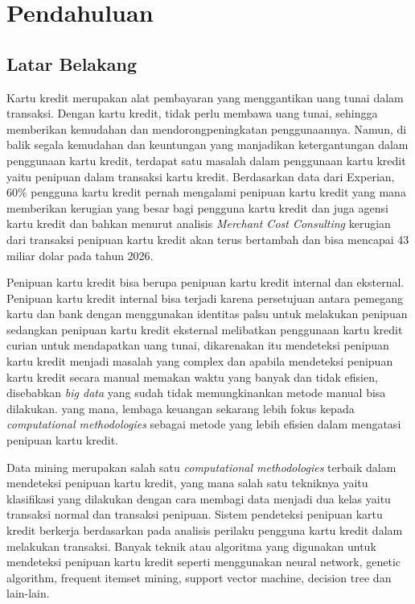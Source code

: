 \newpage
\chapter{Pendahuluan} \label{Bab I}

\section{Latar Belakang} \label{I.Latar Belakang}
Kartu kredit merupakan alat pembayaran yang menggantikan uang tunai dalam transaksi. Dengan kartu kredit, tidak perlu membawa uang tunai, sehingga memberikan kemudahan dan mendorongpeningkatan penggunaannya\cite{setiawan2022perlindungan}. Namun, di balik segala kemudahan dan keuntungan yang manjadikan ketergantungan dalam penggunaan kartu kredit, terdapat satu masalah dalam penggunaan kartu kredit yaitu penipuan dalam transaksi kartu kredit\cite{hendarsyah2020analisis}. Berdasarkan data dari Experian, 60\% pengguna kartu kredit pernah mengalami penipuan kartu kredit yang mana memberikan kerugian yang besar bagi pengguna kartu kredit dan juga agensi kartu kredit\cite{experian_2024} dan bahkan menurut analisis \textit{Merchant Cost Consulting} kerugian dari transaksi penipuan kartu kredit akan terus bertambah dan bisa mencapai 43 miliar dolar pada tahun 2026\cite{merchantcostconsulting_2024}.

Penipuan kartu kredit bisa berupa penipuan kartu kredit internal dan eksternal. Penipuan kartu kredit internal bisa terjadi karena persetujuan antara pemegang kartu dan bank dengan menggunakan identitas palsu untuk melakukan penipuan sedangkan penipuan kartu kredit eksternal melibatkan penggunaan kartu kredit curian untuk mendapatkan uang tunai\cite{chaudhary2012review}, dikarenakan itu mendeteksi penipuan kartu kredit menjadi masalah yang complex dan apabila mendeteksi penipuan kartu kredit secara manual memakan waktu yang banyak dan tidak efisien, disebabkan \textit{big data} yang sudah tidak memungkinankan metode manual bisa dilakukan. yang mana, lembaga keuangan sekarang lebih fokus kepada \textit{computational methodologies} sebagai metode yang lebih efisien dalam mengatasi penipuan kartu kredit\cite{west2016intelligent}.

Data mining merupakan salah satu \textit{computational methodologies} terbaik dalam mendeteksi penipuan kartu kredit, yang mana salah satu tekniknya yaitu klasifikasi yang dilakukan dengan cara membagi data menjadi dua kelas yaitu transaksi normal dan transaksi penipuan\cite{ngai2011application}. Sistem pendeteksi penipuan kartu kredit berkerja berdasarkan pada analisis perilaku pengguna kartu kredit dalam melakukan transaksi. Banyak teknik atau algoritma yang digunakan untuk mendeteksi penipuan kartu kredit seperti menggunakan neural network\cite{georgieva2019using}, genetic algorithm\cite{benchaji2019using}, frequent itemset mining\cite{seeja2014fraudminer}, support vector machine\cite{kumar2022credit}, decision tree\cite{gaikwad2014credit} dan lain-lain. 

